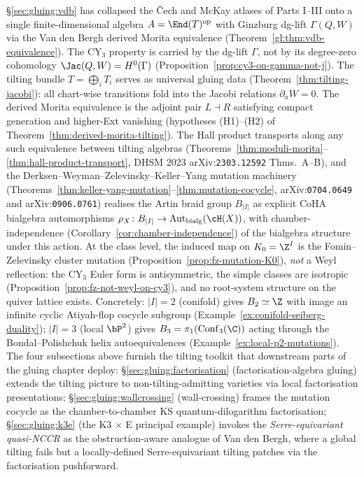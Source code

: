 \S\ref{sec:gluing:vdb} has collapsed the \v{C}ech and McKay atlases of Parts I--III onto a
single finite-dimensional algebra $A = \End(T)^{\mathrm{op}}$ with Ginzburg
dg-lift $\Gamma(Q, W)$ via the Van den Bergh derived Morita equivalence
(Theorem~\ref{gl:thm:vdb-equivalence}). The CY$_3$ property is carried by the
dg-lift $\Gamma$, not by its degree-zero cohomology $\Jac(Q, W) = H^0(\Gamma)$
(Proposition~\ref{prop:cy3-on-gamma-not-j}). The tilting bundle
$T = \bigoplus_i T_i$ serves as universal gluing data
(Theorem~\ref{thm:tilting-jacobi}): all chart-wise transitions fold into the
Jacobi relations $\partial_a W = 0$. The derived Morita equivalence is the
adjoint pair $L \dashv R$ satisfying compact generation and higher-Ext
vanishing (hypotheses (H1)--(H2) of Theorem~\ref{thm:derived-morita-tilting}).
The Hall product transports along any such equivalence between tilting algebras
(Theorems~\ref{thm:moduli-morita}--\ref{thm:hall-product-transport}, DHSM 2023
arXiv:\texttt{2303.12592} Thms.~A--B), and the
Derksen--Weyman--Zelevinsky--Keller--Yang mutation machinery
(Theorems~\ref{thm:keller-yang-mutation}--\ref{thm:mutation-cocycle},
arXiv:\texttt{0704.0649} and arXiv:\texttt{0906.0761})
realises the Artin braid group $B_{|I|}$ as explicit CoHA bialgebra
automorphisms $\rho_X \colon B_{|I|} \to \mathrm{Aut}_{\mathrm{bialg}}(\cH(X))$,
with chamber-independence
(Corollary~\ref{cor:chamber-independence}) of the bialgebra structure under
this action. At the class level, the induced map on
$K_0 = \Z^{I}$ is the Fomin--Zelevinsky cluster mutation
(Proposition~\ref{prop:fz-mutation-K0}), \emph{not} a Weyl reflection: the
CY$_3$ Euler form is antisymmetric, the simple classes are isotropic
(Proposition~\ref{prop:fz-not-weyl-on-cy3}), and no root-system structure
on the quiver lattice exists. Concretely: $|I| = 2$ (conifold) gives
$B_2 \simeq \Z$ with image an infinite cyclic Atiyah-flop cocycle
subgroup (Example~\ref{ex:conifold-seiberg-duality}); $|I| = 3$ (local
$\bP^2$) gives $B_3 = \pi_1(\mathrm{Conf}_3(\C))$ acting through the
Bondal--Polishchuk helix autoequivalences
(Example~\ref{ex:local-p2-mutations}). The
four subsections above furnish the tilting toolkit that downstream parts of
the gluing chapter deploy: \S\ref{sec:gluing:factorisation} (factorisation-algebra gluing) extends the
tilting picture to non-tilting-admitting varieties via local factorisation
presentations; \S\ref{sec:gluing:wallcrossing} (wall-crossing) frames the mutation cocycle as the
chamber-to-chamber KS quantum-dilogarithm factorisation; \S\ref{sec:gluing:k3e} (the
K3 $\times$ E principal example) invokes the \emph{Serre-equivariant quasi-NCCR}
as the obstruction-aware analogue of Van den Bergh, where a global tilting
fails but a locally-defined Serre-equivariant tilting patches via the
factorisation pushforward.
